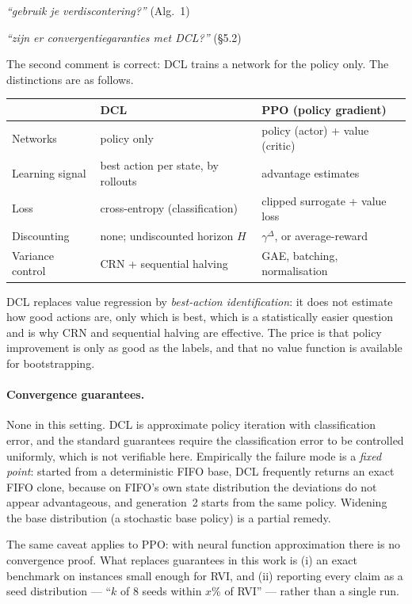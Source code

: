\documentclass[11pt,a4paper]{article}
\newcommand{\comment}[1]{\textcolor{red!70!black}{\textit{``#1''}}}
\begin{document}
\comment{gebruik je verdiscontering?} \hfill (Alg.~1)

\comment{zijn er convergentiegaranties met DCL?} \hfill (\S5.2)

The second comment is correct: DCL trains a network for the policy only.  The
distinctions are as follows.

\begin{center}
\begin{tabular}{lll}
\toprule
 & \textbf{DCL} & \textbf{PPO (policy gradient)} \\
\midrule
Networks & policy only & policy (actor) + value (critic) \\
Learning signal & best action per state, by rollouts & advantage estimates \\
Loss & cross-entropy (classification) & clipped surrogate + value loss \\
Discounting & none; undiscounted horizon $H$ & $\gamma^{\Delta}$, or average-reward \\
Variance control & CRN + sequential halving & GAE, batching, normalisation \\
\bottomrule
\end{tabular}
\end{center}

DCL replaces value regression by \emph{best-action identification}: it does not
estimate how good actions are, only which is best, which is a statistically
easier question and is why CRN and sequential halving are effective.  The price
is that policy improvement is only as good as the labels, and that no value
function is available for bootstrapping.

\paragraph{Convergence guarantees.}
None in this setting.  DCL is approximate policy iteration with classification
error, and the standard guarantees require the classification error to be
controlled uniformly, which is not verifiable here.  Empirically the failure
mode is a \emph{fixed point}: started from a deterministic FIFO base, DCL
frequently returns an exact FIFO clone, because on FIFO's own state
distribution the deviations do not appear advantageous, and generation~2 starts
from the same policy.  Widening the base distribution (a stochastic base
policy) is a partial remedy.

The same caveat applies to PPO: with neural function approximation there is no
convergence proof.  What replaces guarantees in this work is (i) an exact
benchmark on instances small enough for RVI, and (ii) reporting every claim as
a seed distribution --- ``$k$ of 8 seeds within $x\%$ of RVI'' --- rather than a
single run.
\end{document}

